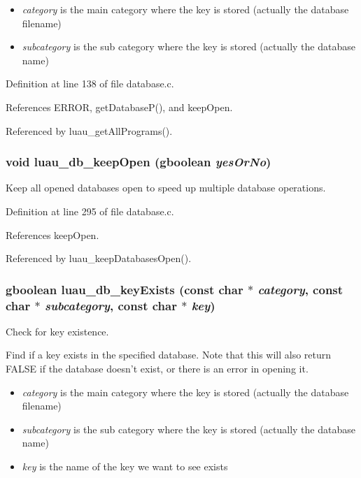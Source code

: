 \begin{itemize}
\item {\em category\/} is the main category where the key is stored (actually the database filename) \item {\em subcategory\/} is the sub category where the key is stored (actually the database name) 
\end{itemize}


Definition at line 138 of file database.c.

References ERROR, get\-Database\-P(), and keep\-Open.

Referenced by luau\_\-get\-All\-Programs().
\subsubsection{\setlength{\rightskip}{0pt plus 5cm}void luau\_\-db\_\-keep\-Open (gboolean {\em yes\-Or\-No})}\label{database_8c_a13}


Keep all opened databases open to speed up multiple database operations. 



Definition at line 295 of file database.c.

References keep\-Open.

Referenced by luau\_\-keep\-Databases\-Open().
\subsubsection{\setlength{\rightskip}{0pt plus 5cm}gboolean luau\_\-db\_\-key\-Exists (const char $\ast$ {\em category}, const char $\ast$ {\em subcategory}, const char $\ast$ {\em key})}\label{database_8c_a5}


Check for key existence. 

Find if a key exists in the specified database. Note that this will also return FALSE if the database doesn't exist, or there is an error in opening it.

\begin{itemize}
\item {\em category\/} is the main category where the key is stored (actually the database filename) \item {\em subcategory\/} is the sub category where the key is stored (actually the database name) \item {\em key\/} is the name of the key we want to see exists 
\end{itemize}


